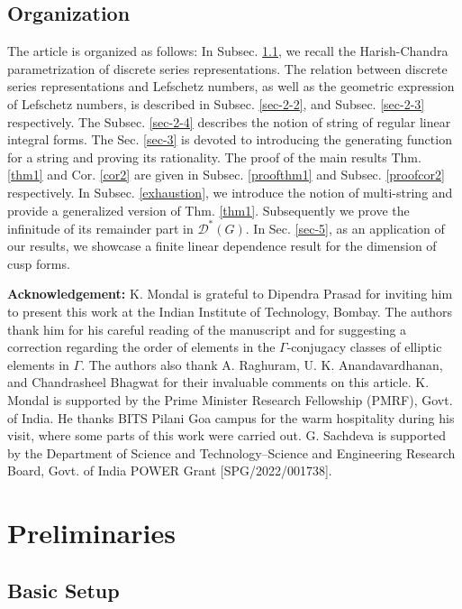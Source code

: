 \documentclass[11 pt]{amsart}
\theoremstyle{definition}
\numberwithin{equation}{section}
\begin{document}
\subsection{Organization}
The article is organized as follows: In Subsec. \ref{basicsetup}, we recall the Harish-Chandra parametrization of discrete series representations. The relation between discrete series representations and Lefschetz numbers, as well as the geometric expression of Lefschetz numbers, is described in Subsec. \ref{sec-2-2}, and Subsec. \ref{sec-2-3} respectively. The Subsec. \ref{sec-2-4} describes the notion of string of regular linear integral forms. The Sec. \ref{sec-3} is devoted to introducing the generating function for a string and proving its rationality. The proof of the main results Thm. \ref{thm1} and Cor. \ref{cor2} are given in Subsec. \ref{proofthm1} and Subsec. \ref{proofcor2} respectively. In Subsec. \ref{exhaustion}, we introduce the notion of multi-string and provide a generalized version of Thm. \ref{thm1}. Subsequently we prove the infinitude of its remainder part in $\mathcal{D^*}(G)$. In Sec. \ref{sec-5}, as an application of our results, we showcase a finite linear dependence result for the dimension of cusp forms.

\vspace{10pt}

\noindent \textbf{Acknowledgement:} K. Mondal is grateful to Dipendra Prasad for inviting him to present this work at the Indian Institute of Technology, Bombay. The authors thank him for his careful reading of the manuscript and for suggesting a correction regarding the order of elements in the $\Gamma$-conjugacy classes of elliptic elements in $\Gamma$. The authors also thank A. Raghuram, U. K. Anandavardhanan, and Chandrasheel Bhagwat for their invaluable comments on this article. K. Mondal is supported by the Prime Minister Research Fellowship (PMRF), Govt. of India. He thanks BITS Pilani Goa campus for the warm hospitality during his visit, where some parts of this work were carried out. G. Sachdeva is supported by the Department of Science and Technology–Science and Engineering Research Board, Govt. of India POWER Grant [SPG/2022/001738]. 

\section {Preliminaries}
\subsection {Basic Setup} \label{basicsetup}
\end{document}
